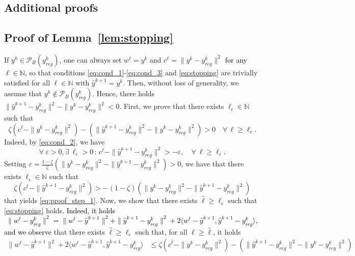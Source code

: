 \documentclass[pdflatex,sn-mathphys-num]{sn-jnl}
\numberwithin{equation}{section}%
\def\N{\mathbb{N}}
\newcommand{\norm}[1]{\| #1 \|}
\newcommand{\yck}{{y_{reg}^k}}
\newcommand{\REV}[1]{\textcolor{black}{#1}}
\theoremstyle{thmstyleone}%
\theoremstyle{thmstyletwo}%
\theoremstyle{thmstylethree}%
\begin{document}
\begin{appendices}

\section{Additional proofs}

\subsection{Proof of Lemma~\ref{lem:stopping}}\label{appendix:A1}
If $y^k \in  \mathcal{P}_{B}(\yck)$,  one can always set $w^{\ell} = y^k$ and $c^{\ell} = \|y^k-\yck\|^2$ \REV{for any $\ell\in\N$}, so that conditions \eqref{eq:cond_1}-\eqref{eq:cond_3} and \eqref{eq:stopping} are trivially satisfied for all $\ell\in\N$ with $\hat{y}^{k+1}=y^k $. Then, without loss of generality, we assume that $y^k\notin \mathcal{P}_{B}(\yck)$. Hence, there holds $\norm{\hat{y}^{k+1} - \yck}^2 - \norm{y^k - \yck}^2 < 0$. 
First, we prove that there exists $\ell_\epsilon \in \N$ such that
\begin{equation}\label{eq:proof_step_1}
     \zeta ({c^{\ell}} - \norm{y^k - \yck}^2)-(\norm{\hat{y}^{k+1} - \yck}^2 - \norm{y^k - \yck}^2)>0  \quad \forall \, \ell \ge \ell_\epsilon.
\end{equation}
Indeed, by \eqref{eq:cond_2}, we have
\[
\forall \ \varepsilon > 0, \exists \ \ell_\varepsilon > 0 \, : \, c^\ell - \norm{\hat{y}^{k+1} - \yck}^2 > - \varepsilon, \quad \forall \ \ell \ge \ell_\varepsilon.
\]
Setting $\varepsilon = \frac{1-\zeta}{\zeta} (\norm{y^k-\yck}^2 - \norm{\hat{y}^{k+1} - \yck}^2)>0$, we have that there exists $\ell_{\epsilon} \in \N$ such that
\begin{equation}
    \zeta(c^\ell - \norm{\hat{y}^{k+1} - \yck}^2)  > - (1-\zeta) (\norm{y^k-\yck}^2 - \norm{\hat{y}^{k+1} - \yck}^2) \nonumber
\end{equation}
that yields \eqref{eq:proof_step_1}.
Now, we show that there exists $\hat \ell \geq   \ell_\epsilon$ such that \eqref{eq:stopping} holds. \REV{Indeed, it holds
\begin{equation}\label{eq:technical2}
        \|w^{\ell}-\yck\|^2=\|w^{\ell}-\hat{y}^{k+1}\|^2+\|\hat{y}^{k+1}-\yck\|^2+2\langle w^{\ell}-\hat{y}^{k+1},\hat{y}^{k+1}-\yck\rangle,
\end{equation}
and we observe} that there exists $\hat{\ell}\geq \ell_\epsilon$ such that, for all $\ell\geq \hat{\ell}$, it holds
\begin{align}\label{eq:technical3}
    \|w^{\ell}-\hat{y}^{k+1}\|^2+2\langle w^{\ell}-\hat{y}^{k+1},\hat{y}^{k+1}-\yck\rangle&\leq \zeta(c^{\hat{\ell}}-\|y^k-\yck\|^2)-\left(\|\hat{y}^{k+1}-\yck\|^2-\|y^k-\yck\|^2\right)\nonumber\\

\end{align}
\end{appendices}
\end{document}
